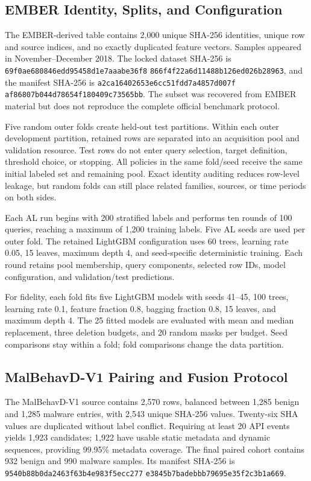 \subsection{EMBER Identity, Splits, and Configuration}

The EMBER-derived table contains 2,000 unique SHA-256 identities, unique row and
source indices, and no exactly duplicated feature vectors. Samples appeared in
November--December 2018. The locked dataset SHA-256 is
\texttt{69f0ae680846edd95458d1e7aaabe36f8}\-
\texttt{866f4f22a6d11488b126ed026b28963}, and the manifest SHA-256 is
\texttt{a2ca16402653e6cc51fdd7a4857d007f}\-
\texttt{af86807b044d78654f180409c73565bb}. The subset was recovered from EMBER
material but does not reproduce the complete official benchmark protocol.

Five random outer folds create held-out test partitions. Within each outer
development partition, retained rows are separated into an acquisition pool and
validation resource. Test rows do not enter query selection, target definition,
threshold choice, or stopping. All policies in the same fold/seed receive the
same initial labeled set and remaining pool. Exact identity auditing reduces
row-level leakage, but random folds can still place related families, sources,
or time periods on both sides.

Each AL run begins with 200 stratified labels and performs ten rounds of 100
queries, reaching a maximum of 1,200 training labels. Five AL seeds are used per
outer fold. The retained LightGBM configuration uses 60 trees, learning rate
0.05, 15 leaves, maximum depth 4, and seed-specific deterministic training. Each
round retains pool membership, query components, selected row IDs, model
configuration, and validation/test predictions.

For fidelity, each fold fits five LightGBM models with seeds 41--45, 100 trees,
learning rate 0.1, feature fraction 0.8, bagging fraction 0.8, 15 leaves, and
maximum depth 4. The 25 fitted models are evaluated with mean and median
replacement, three deletion budgets, and 20 random masks per budget. Seed
comparisons stay within a fold; fold comparisons change the data partition.

\subsection{MalBehavD-V1 Pairing and Fusion Protocol}

The MalBehavD-V1 source contains 2,570 rows, balanced between 1,285 benign and
1,285 malware entries, with 2,543 unique SHA-256 values. Twenty-six SHA values
are duplicated without label conflict. Requiring at least 20 API events yields
1,923 candidates; 1,922 have usable static metadata and dynamic sequences,
providing 99.95\% metadata coverage. The final paired cohort contains 932 benign
and 990 malware samples. Its manifest SHA-256 is
\texttt{9540b88b0da2463f63b4e983f5ecc277}\-
\texttt{e3845b7badebbb79695e35f2c3b1a669}.

